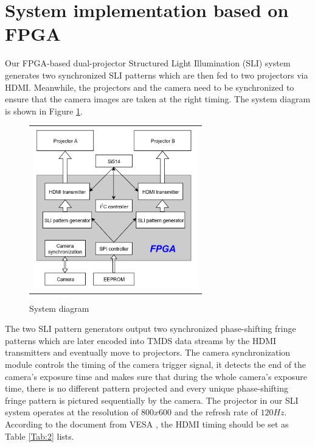 \documentclass[]{spie}  %
\begin{document}

\section{System implementation based on FPGA}
Our FPGA-based dual-projector Structured Light Illumination (SLI) system generates two synchronized SLI patterns which are then fed to two projectors via HDMI. Meanwhile, the projectors and the camera need to be synchronized to ensure that the camera images are taken at the right timing. The system diagram is shown in Figure \ref{Fig:1}.

\begin{figure}
   \begin{center}
   \begin{tabular}{c}
   \includegraphics[height=7cm]{sysdg.png}
   \end{tabular}
   \end{center}
   \caption{System diagram}
   \label{Fig:1}
   \end{figure} 

The two SLI pattern generators output two synchronized phase-shifting fringe patterns which are later encoded into TMDS data streams by the HDMI transmitters and eventually move to projectors. The camera synchronization module controls the timing of the camera trigger signal, it detects the end of the camera's exposure time and makes sure that during the whole camera's exposure time, there is no different pattern projected and every unique phase-shifting fringe pattern is pictured sequentially by the camera. The projector in our SLI system operates at the resolution of $800x600$ and the refresh rate of $120 Hz$. According to the document from VESA \cite{vesa07}, the HDMI timing should be set as Table \ref{Tab:2} lists.
\end{document}
